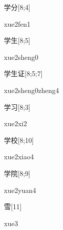 \begin{verbete}{学分}[8;4]
\begin{pronuncia}{xue2fen1}
\end{pronuncia}
\end{verbete}

\begin{verbete}{学生}[8;5]
\begin{pronuncia}{xue2sheng0}
\end{pronuncia}
\end{verbete}

\begin{verbete}{学生证}[8;5;7]
\begin{pronuncia}[\\]{xue2sheng0zheng4}
\end{pronuncia}
\end{verbete}

\begin{verbete}[xue2xi2]{学习}[8;3]
\begin{pronuncia}{xue2xi2}
\end{pronuncia}
\end{verbete}

\begin{verbete}{学校}[8;10]
\begin{pronuncia}{xue2xiao4}
\end{pronuncia}
\end{verbete}

\begin{verbete}{学院}[8;9]
\begin{pronuncia}{xue2yuan4}
\end{pronuncia}
\end{verbete}

\begin{verbete}[xue3]{雪}[11]
\begin{pronuncia}{xue3}
\end{pronuncia}
\end{verbete}

